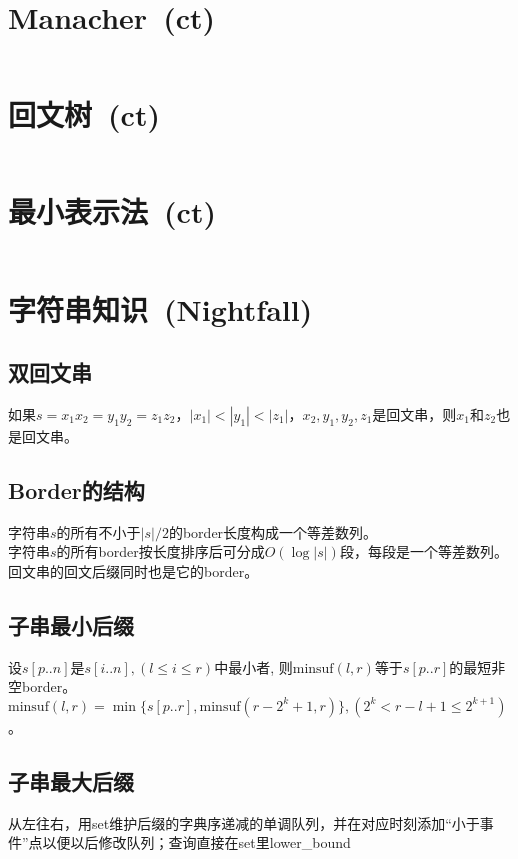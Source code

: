 \section{Manacher\ \small(ct)}
	\inputminted{cpp}{String/manacher.cpp}
\section{回文树\ \small(ct)}
	\inputminted{cpp}{String/palindromic_tree.cpp}
\section{最小表示法\ \small(ct)}
	\inputminted{cpp}{String/minimal_rounding_string.cpp}
\section{字符串知识\ \small(Nightfall)}
	\subsection*{双回文串}
		如果$ s = x_1 x_2 = y_1 y_2 = z_1 z_2 $，$ \left|x_1\right| < \left|y_1\right| < \left|z_1\right| $，$ x_2, y_1, y_2, z_1 $是回文串，则$ x_1 $和$ z_2 $也是回文串。
	\subsection*{Border的结构}
		字符串$ s $的所有不小于$ \left|s\right| / 2 $的border长度构成一个等差数列。
		\\字符串$ s $的所有border按长度排序后可分成$ O(\log \left| s \right|) $段，每段是一个等差数列。
		\\回文串的回文后缀同时也是它的border。
	\subsection*{子串最小后缀}
		设$ s[p..n] $是$ s[i..n], (l \leq i \leq r) $中最小者, 则$ \text{minsuf}(l, r) $等于$ s[p..r] $的最短非空border。$ \text{minsuf}(l, r) = \min \lbrace s[p..r], \text{minsuf}(r - 2^k + 1, r) \rbrace, (2^k < r - l + 1 \leq 2^{k + 1} ) $。
	\subsection*{子串最大后缀}
		从左往右，用set维护后缀的字典序递减的单调队列，并在对应时刻添加“小于事件”点以便以后修改队列；查询直接在set里lower\_bound